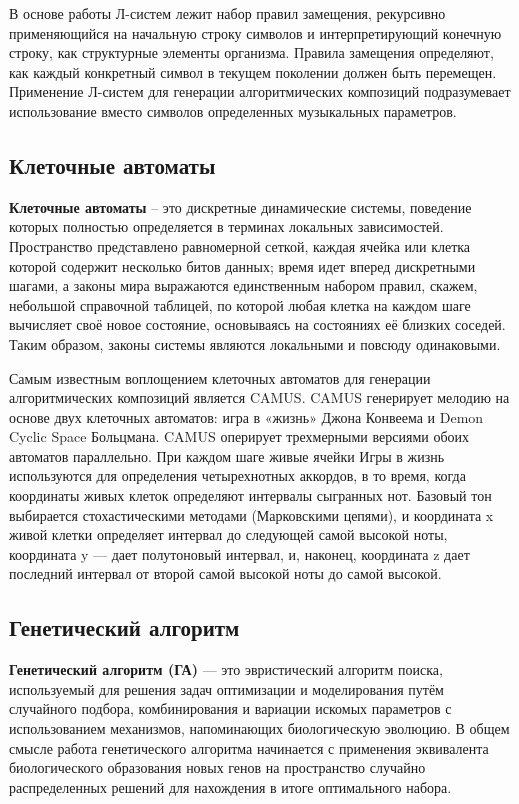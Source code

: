 В основе работы Л-систем лежит набор правил замещения, рекурсивно применяющийся на начальную строку символов и интерпретирующий конечную строку, как структурные элементы организма. Правила замещения определяют, как каждый конкретный символ в текущем поколении должен быть перемещен. Применение Л-систем для генерации алгоритмических композиций подразумевает использование вместо символов определенных музыкальных параметров.


\subsection{Клеточные автоматы}

\textbf{Клеточные автоматы} -- это дискретные динамические системы, поведение которых полностью определяется в терминах локальных зависимостей. Пространство представлено равномерной сеткой, каждая ячейка или клетка которой содержит несколько битов данных; время идет вперед дискретными шагами, а законы мира выражаются единственным набором правил, скажем, небольшой справочной таблицей, по которой любая клетка на каждом шаге вычисляет своё новое состояние, основываясь на состояниях её близких соседей. Таким  образом,  законы  системы  являются  локальными  и повсюду одинаковыми.

Самым известным воплощением клеточных автоматов для генерации алгоритмических композиций является CAMUS. CAMUS генерирует мелодию на основе двух клеточных автоматов: игра в «жизнь» \cite{game-of-life} Джона Конвеема и Demon Cyclic Space Больцмана. CAMUS оперирует трехмерными версиями обоих автоматов параллельно. При каждом шаге живые ячейки Игры в жизнь используются для определения четырехнотных аккордов, в то время, когда координаты живых клеток определяют интервалы сыгранных нот. Базовый тон выбирается стохастическими методами (Марковскими цепями), и координата x живой клетки определяет интервал до следующей самой высокой ноты, координата y — дает полутоновый интервал, и, наконец, координата z дает последний интервал от второй самой высокой ноты до самой высокой.


\subsection{Генетический алгоритм}

\textbf{Генетический алгоритм (ГА)} \cite{gen-alg} — это эвристический алгоритм поиска, используемый для решения задач оптимизации и моделирования путём случайного подбора, комбинирования и вариации искомых параметров с использованием механизмов, напоминающих биологическую эволюцию. В общем смысле работа генетического алгоритма начинается с применения эквивалента биологического образования новых генов на пространство случайно распределенных решений для нахождения в итоге оптимального набора. 

